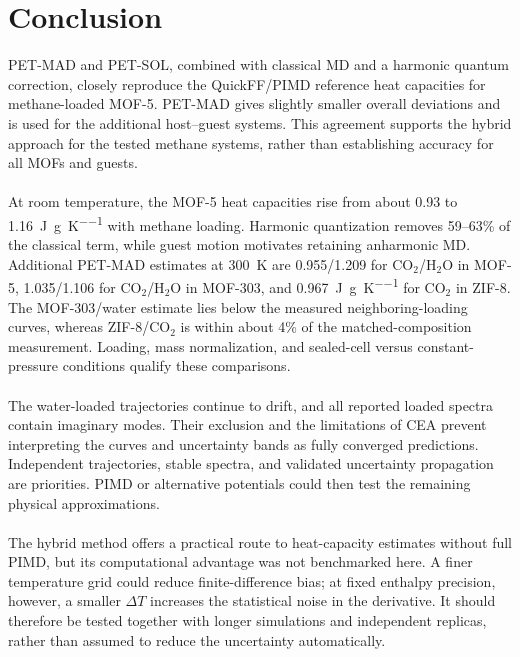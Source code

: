 \documentclass[12pt,a4paper]{article}
\numberwithin{equation}{section}
\begin{document}
\section{Conclusion}

PET-MAD and PET-SOL, combined with classical MD and a harmonic quantum
correction, closely reproduce the QuickFF/PIMD reference heat capacities
for methane-loaded MOF-5. PET-MAD gives slightly smaller overall deviations
and is used for the additional host--guest systems. This agreement supports
the hybrid approach for the tested methane systems, rather than establishing
accuracy for all MOFs and guests.
\\
\\
At room temperature, the MOF-5 heat capacities rise from about 0.93 to
\SI{1.16}{J\per g\per K} with methane loading. Harmonic quantization
removes 59--63\% of the classical term, while guest motion motivates
retaining anharmonic MD. Additional PET-MAD estimates at \SI{300}{K}
are 0.955/1.209 for CO$_2$/H$_2$O in MOF-5, 1.035/1.106 for
CO$_2$/H$_2$O in MOF-303, and \SI{0.967}{J\per g\per K} for
CO$_2$ in ZIF-8. The MOF-303/water estimate lies below the measured
neighboring-loading curves, whereas ZIF-8/CO$_2$ is within about 4\%
of the matched-composition measurement. Loading, mass normalization, and
sealed-cell versus constant-pressure conditions qualify these comparisons.
\\
\\
The water-loaded trajectories continue to drift, and all reported loaded
spectra contain imaginary modes. Their exclusion and the limitations of
CEA prevent interpreting the curves and uncertainty bands as fully
converged predictions. Independent trajectories, stable spectra, and
validated uncertainty propagation are priorities. PIMD or alternative
potentials could then test the remaining physical approximations.
\\
\\
The hybrid method offers a practical route to heat-capacity estimates
without full PIMD, but its computational advantage was not benchmarked here.
A finer temperature grid could reduce finite-difference bias; at fixed
enthalpy precision, however, a smaller $\Delta T$ increases the statistical
noise in the derivative. It should therefore be tested together with longer
simulations and independent replicas, rather than assumed to reduce the
uncertainty automatically.
\end{document}

